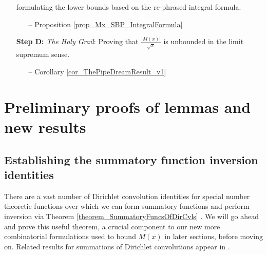 \documentclass[11pt,reqno,a4letter]{article}
\numberwithin{figure}{section}
\numberwithin{table}{section}
\newcommand{\cf}{\textit{cf.\ }}
\newcommand{\floor}[1]{\left\lfloor #1 \right\rfloor}
\theoremstyle{plain}
\numberwithin{theorem}{section}
\theoremstyle{definition}
\begin{document}
\begin{itemize}[noitemsep,topsep=0pt]
     formulating the lower bounds based on the re-phrased integral formula. 
     \begin{itemize}[noitemsep,topsep=0pt]
     \item[--] \small{Proposition \ref{prop_Mx_SBP_IntegralFormula}} 
     \end{itemize} 
\item[\textbf{Step D:}] \textit{The Holy Grail}: Proving that $\frac{|M(x)|}{\sqrt{x}}$ is 
     unbounded in the limit supremum sense. 
     \begin{itemize}[noitemsep,topsep=0pt]
     \item[--] \small{Corollary \ref{cor_ThePipeDreamResult_v1}} 
     \end{itemize} 

\end{itemize} 

\newpage 
\section{Preliminary proofs of lemmas and new results} 
\label{Section_PrelimProofs_Config} 

\subsection{Establishing the summatory function inversion identities} 

There are a vast number of Dirichlet convolution 
identities for special number theoretic functions over which 
we can form summatory functions and perform inversion via 
Theorem \ref{theorem_SummatoryFuncsOfDirCvls} \cite{CATALOG-INTDIRSERIES,CATALOG-LAMBERTSERIES}. 
We will go ahead and prove this useful theorem, a crucial component to our new more combinatorial 
formulations used to bound $M(x)$ in later sections, before moving on. 
Related results for summations of Dirichlet convolutions appear in 
\cite[\S 2.14; \S 3.10; \S 3.12; \cf \S 4.9, p.\ 95]{APOSTOLANUMT}. 
\end{document}
